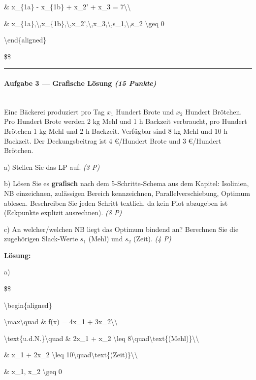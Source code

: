 \documentclass[11pt, a4paper]{article}
\begin{document}
\& x\_\{1a\} - x\_\{1b\} + x\_2' + x\_3 = 7\textbackslash{}\textbackslash{}

\& x\_\{1a\},\textbackslash{},x\_\{1b\},\textbackslash{},x\_2',\textbackslash{},x\_3,\textbackslash{},s\_1,\textbackslash{},s\_2 \textbackslash{}geq 0

\textbackslash{}end\{aligned\}

\$\$



\noindent\textcolor{rulegray}{\rule{\linewidth}{0.4pt}}


\paragraph{Aufgabe 3 — Grafische Lösung \textit{(15 Punkte)}}\mbox{}\\[2pt]

Eine Bäckerei produziert pro Tag $x_1$ Hundert Brote und $x_2$ Hundert Brötchen. Pro Hundert Brote werden 2 kg Mehl und 1 h Backzeit verbraucht, pro Hundert Brötchen 1 kg Mehl und 2 h Backzeit. Verfügbar sind 8 kg Mehl und 10 h Backzeit. Der Deckungsbeitrag ist 4 €/Hundert Brote und 3 €/Hundert Brötchen.


a) Stellen Sie das LP auf. \textit{(3 P)}


b) Lösen Sie es \textbf{grafisch} nach dem 5-Schritte-Schema aus dem Kapitel: Isolinien, NB einzeichnen, zulässigen Bereich kennzeichnen, Parallelverschiebung, Optimum ablesen. Beschreiben Sie jeden Schritt textlich, da kein Plot abzugeben ist (Eckpunkte explizit ausrechnen). \textit{(8 P)}


c) An welcher/welchen NB liegt das Optimum bindend an? Berechnen Sie die zugehörigen Slack-Werte $s_1$ (Mehl) und $s_2$ (Zeit). \textit{(4 P)}


\textbf{Lösung:}


a)

\$\$

\textbackslash{}begin\{aligned\}

\textbackslash{}max\textbackslash{}quad \& f(x) = 4x\_1 + 3x\_2\textbackslash{}\textbackslash{}

\textbackslash{}text\{u.d.N.\}\textbackslash{}quad \& 2x\_1 + x\_2 \textbackslash{}leq 8\textbackslash{}quad\textbackslash{}text\{(Mehl)\}\textbackslash{}\textbackslash{}

\& x\_1 + 2x\_2 \textbackslash{}leq 10\textbackslash{}quad\textbackslash{}text\{(Zeit)\}\textbackslash{}\textbackslash{}

\& x\_1, x\_2 \textbackslash{}geq 0
\end{document}
